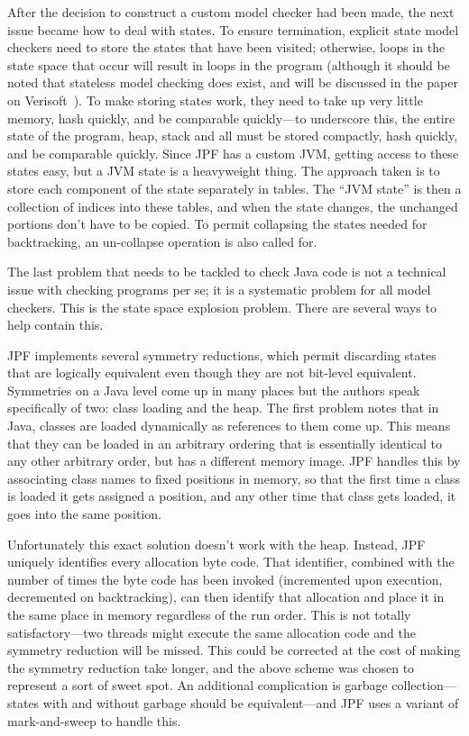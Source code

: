 \documentclass{article}
\begin{document}
\begin{multicols}{2}
After the decision to construct a custom model checker had been made,
the next issue became how to deal with states.  To ensure termination,
explicit state model checkers need to store the states that have been
visited; otherwise, loops in the state space that occur will result in
loops in the program (although it should be noted that stateless model
checking does exist, and will be discussed in the paper on
Verisoft~\cite{263717}).  To make storing states work, they need to
take up very little memory, hash quickly, and be comparable
quickly---to underscore this, the entire state of the program, heap,
stack and all must be stored compactly, hash quickly, and be
comparable quickly.  Since JPF has a custom JVM, getting access to
these states easy, but a JVM state is a heavyweight thing.  The
approach taken is to store each component of the state separately in
tables.  The ``JVM state'' is then a collection of indices into these
tables, and when the state changes, the unchanged portions don't have
to be copied.  To permit collapsing the states needed for
backtracking, an un-collapse operation is also called for.

The last problem that needs to be tackled to check Java code is not a
technical issue with checking programs per se; it is a systematic
problem for all model checkers.  This is the state space explosion
problem.  There are several ways to help contain this.

JPF implements several symmetry reductions, which permit discarding
states that are logically equivalent even though they are not
bit-level equivalent.  Symmetries on a Java level come up in many
places but the authors speak specifically of two: class loading and
the heap.  The first problem notes that in Java, classes are loaded
dynamically as references to them come up.  This means that they can
be loaded in an arbitrary ordering that is essentially identical to
any other arbitrary order, but has a different memory image.  JPF
handles this by associating class names to fixed positions in memory,
so that the first time a class is loaded it gets assigned a position,
and any other time that class gets loaded, it goes into the same
position.

Unfortunately this exact solution doesn't work with the heap.
Instead, JPF uniquely identifies every allocation byte code.  That
identifier, combined with the number of times the byte code has been
invoked (incremented upon execution, decremented on backtracking), can
then identify that allocation and place it in the same place in memory
regardless of the run order.  This is not totally satisfactory---two
threads might execute the same allocation code and the symmetry
reduction will be missed.  This could be corrected at the cost of
making the symmetry reduction take longer, and the above scheme was
chosen to represent a sort of sweet spot.  An additional complication
is garbage collection---states with and without garbage should be
equivalent---and JPF uses a variant of mark-and-sweep to handle this.


\end{multicols}
\end{document}

